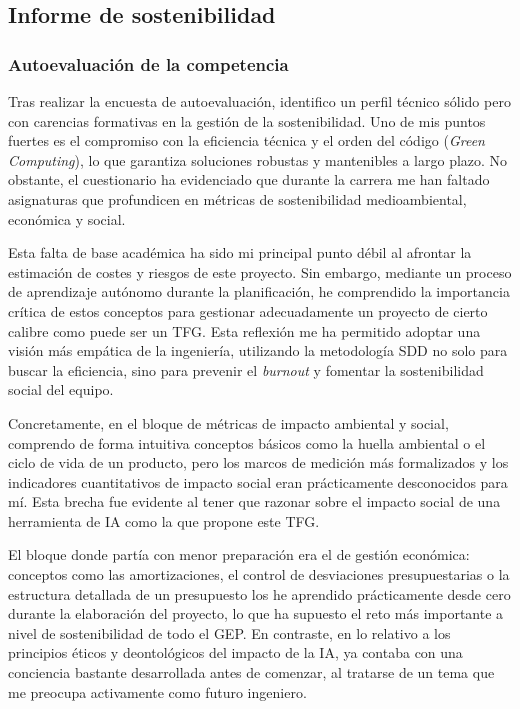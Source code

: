 \documentclass[11pt, letterpaper]{article}
\begin{document}
\subsection{Informe de sostenibilidad}
\label{sec:sostenibilidad}

\subsubsection{Autoevaluación de la competencia}
\label{sec:autoevaluacion}
Tras realizar la encuesta de autoevaluación, identifico un perfil técnico sólido pero con carencias formativas en la gestión de la sostenibilidad. Uno de mis puntos fuertes es el compromiso con la eficiencia técnica y el orden del código (\textit{Green Computing}), lo que garantiza soluciones robustas y mantenibles a largo plazo. No obstante, el cuestionario ha evidenciado que durante la carrera me han faltado asignaturas que profundicen en métricas de sostenibilidad medioambiental, económica y social.

Esta falta de base académica ha sido mi principal punto débil al afrontar la estimación de costes y riesgos de este proyecto. Sin embargo, mediante un proceso de aprendizaje autónomo durante la planificación, he comprendido la importancia crítica de estos conceptos para gestionar adecuadamente un proyecto de cierto calibre como puede ser un TFG. Esta reflexión me ha permitido adoptar una visión más empática de la ingeniería, utilizando la metodología SDD no solo para buscar la eficiencia, sino para prevenir el \textit{burnout} y fomentar la sostenibilidad social del equipo.

Concretamente, en el bloque de métricas de impacto ambiental y social, comprendo de forma intuitiva conceptos básicos como la huella ambiental o el ciclo de vida de un producto, pero los marcos de medición más formalizados y los indicadores cuantitativos de impacto social eran prácticamente desconocidos para mí. Esta brecha fue evidente al tener que razonar sobre el impacto social de una herramienta de IA como la que propone este TFG.

El bloque donde partía con menor preparación era el de gestión económica: conceptos como las amortizaciones, el control de desviaciones presupuestarias o la estructura detallada de un presupuesto los he aprendido prácticamente desde cero durante la elaboración del proyecto, lo que ha supuesto el reto más importante a nivel de sostenibilidad de todo el GEP. En contraste, en lo relativo a los principios éticos y deontológicos del impacto de la IA, ya contaba con una conciencia bastante desarrollada antes de comenzar, al tratarse de un tema que me preocupa activamente como futuro ingeniero.
\\
\end{document}
